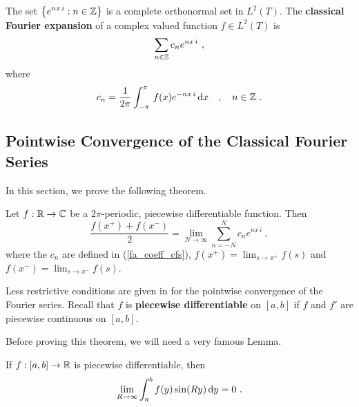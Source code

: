 The set $\displaystyle \left\{ e^{n x\, i} : n \in \mathbb{Z} \right\}$ is a
complete orthonormal set in $\displaystyle L^2(T)$.  The
{\bfseries classical Fourier expansion}
of a complex valued function $\displaystyle f \in L^2(T)$ is
\[
\sum_{n\in \ZZ} c_n e^{n x\, i} \ ,
\]
where
\begin{equation} \label{fa_coeff_cfs}
c_n = \frac{1}{2\pi} \int_{-\pi}^{\pi} \, f(x) e^{-n x\, i} \,\mathrm{d}{x} \quad
, \quad n \in \mathbb{Z} \ .
\end{equation}

\subsection{Pointwise Convergence of the Classical Fourier Series}
\label{sectPtWsConv}

In this section, we prove the following theorem.

\begin{theorem}\label{faFsPwc}
Let $f:\mathbb{R}\to \mathbb{C}$ be a $2\pi$-periodic, piecewise differentiable
function.  Then
\[
\frac{f(x^+) + f(x^-)}{2} = \lim_{N\to \infty} \sum_{n=-N}^N c_n e^{n x\, i} \ ,
\]
where the $c_n$ are defined in (\ref{fa_coeff_cfs}),
$\displaystyle f(x^+) = \lim_{s\to x^+} f(s)$ and
$\displaystyle f(x^-) = \lim_{s\to x^-} f(s)$.
\end{theorem}

Less restrictive conditions are given in \cite{RuPMA} for the
pointwise convergence of the Fourier series.  Recall that $f$ is
{\bfseries piecewise differentiable}
on $[a,b]$ if $f$ and $f'$ are piecewise continuous on $[a,b]$.

Before proving this theorem, we will need a very famous Lemma.

\begin{lemma}
If $f:[a,b] \to \mathbb{R}$ is piecewise differentiable, then
\[
\lim_{R\to \infty} \int_a^b f(y) \sin(Ry) \,\mathrm{d}{y} = 0 \ .
\]
\end{lemma}

